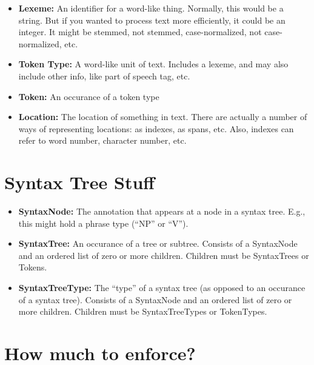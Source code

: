 \documentclass{article}
\begin{document}
\begin{itemize}

  \item \textbf{Lexeme:} An identifier for a word-like thing.
  Normally, this would be a string.  But if you wanted to process text
  more efficiently, it could be an integer.  It might be stemmed, not
  stemmed, case-normalized, not case-normalized, etc.
 
  \item \textbf{Token Type:} A word-like unit of text.  Includes a
  lexeme, and may also include other info, like part of speech tag,
  etc.

  \item \textbf{Token:} An occurance of a token type

  \item \textbf{Location:} The location of something in text.  There
  are actually a number of ways of representing locations: as indexes,
  as spans, etc.  Also, indexes can refer to word number, character
  number, etc.

\end{itemize}

\section{Syntax Tree Stuff}

\begin{itemize}

  \item \textbf{SyntaxNode:} The annotation that appears at a node
  in a syntax tree.  E.g., this might hold a phrase type (``NP'' or
  ``V'').

  \item \textbf{SyntaxTree:} An occurance of a tree or subtree.
  Consists of a SyntaxNode and an ordered list of zero or more
  children.  Children must be SyntaxTrees or Tokens.

  \item \textbf{SyntaxTreeType:} The ``type'' of a syntax tree (as
  opposed to an occurance of a syntax tree).  Consists of a SyntaxNode
  and an ordered list of zero or more children.  Children must be
  SyntaxTreeTypes or TokenTypes.

\end{itemize}

\section{How much to enforce?}
\end{document}
